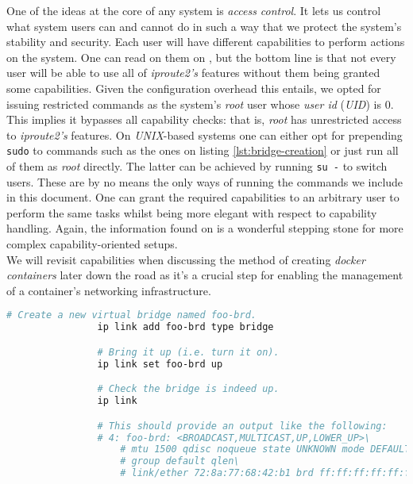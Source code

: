                 One of the ideas at the core of any system is \textit{access control}. It lets us control what system users can and cannot do in such a way that we protect the system's stability and security. Each user will have different capabilities to perform actions on the system. One can read on them on \cite{bib:man-capabilities}, but the bottom line is that not every user will be able to use all of \textit{iproute2's} features without them being granted some capabilities. Given the configuration overhead this entails, we opted for issuing restricted commands as the system's \textit{root} user whose \textit{user id} (\textit{UID}) is $0$. This implies it bypasses all capability checks: that is, \textit{root} has unrestricted access to \textit{iproute2's} features. On \textit{UNIX}-based systems one can either opt for prepending \texttt{sudo} to commands such as the ones on listing \ref{lst:bridge-creation} or just run all of them as \textit{root} directly. The latter can be achieved by running \texttt{su -} to switch users. These are by no means the only ways of running the commands we include in this document. One can grant the required capabilities to an arbitrary user to perform the same tasks whilst being more elegant with respect to capability handling. Again, the information found on \cite{bib:man-capabilities} is a wonderful stepping stone for more complex capability-oriented setups.\\

                We will revisit capabilities when discussing the method of creating \textit{docker containers} later down the road as it's a crucial step for enabling the management of a container's networking infrastructure.\\

            \begin{lstlisting}[language = bash, caption = Instantiating a Virtual Network Bridge., label = lst:bridge-creation]
                # Create a new virtual bridge named foo-brd.
                ip link add foo-brd type bridge

                # Bring it up (i.e. turn it on).
                ip link set foo-brd up

                # Check the bridge is indeed up.
                ip link

                # This should provide an output like the following:
                # 4: foo-brd: <BROADCAST,MULTICAST,UP,LOWER_UP>\
                    # mtu 1500 qdisc noqueue state UNKNOWN mode DEFAULT
                    # group default qlen\
                    # link/ether 72:8a:77:68:42:b1 brd ff:ff:ff:ff:ff:ff
            \end{lstlisting}

